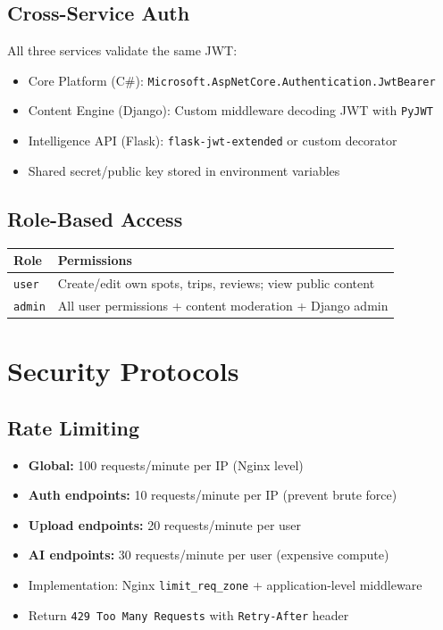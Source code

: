 \documentclass[12pt,letterpaper]{article}
\begin{document}
\subsection{Cross-Service Auth}
All three services validate the same JWT:
\begin{itemize}
  \item Core Platform (C\#): \texttt{Microsoft.AspNetCore.Authentication.JwtBearer}
  \item Content Engine (Django): Custom middleware decoding JWT with \texttt{PyJWT}
  \item Intelligence API (Flask): \texttt{flask-jwt-extended} or custom decorator
  \item Shared secret/public key stored in environment variables
\end{itemize}

\subsection{Role-Based Access}
\begin{tabular}{|l|l|}
\hline
\textbf{Role} & \textbf{Permissions} \\
\hline
\texttt{user} & Create/edit own spots, trips, reviews; view public content \\
\texttt{admin} & All user permissions + content moderation + Django admin \\
\hline
\end{tabular}

\newpage

\section{Security Protocols}

\subsection{Rate Limiting}
\begin{itemize}
  \item \textbf{Global:} 100 requests/minute per IP (Nginx level)
  \item \textbf{Auth endpoints:} 10 requests/minute per IP (prevent brute force)
  \item \textbf{Upload endpoints:} 20 requests/minute per user
  \item \textbf{AI endpoints:} 30 requests/minute per user (expensive compute)
  \item Implementation: Nginx \texttt{limit\_req\_zone} + application-level middleware
  \item Return \texttt{429 Too Many Requests} with \texttt{Retry-After} header
\end{itemize}
\end{document}
